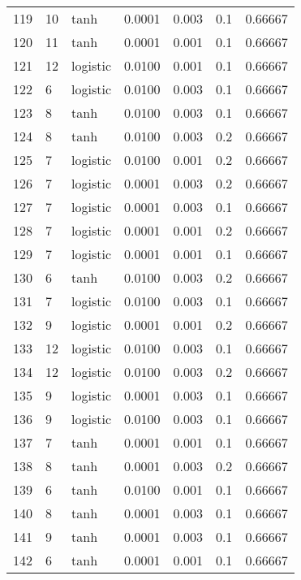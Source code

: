 \begin{tabular}{lllrrrr}
119 &          10 &      tanh &  0.0001 &  0.003 &  0.1 &   0.66667 \\
120 &          11 &      tanh &  0.0001 &  0.001 &  0.1 &   0.66667 \\
121 &          12 &  logistic &  0.0100 &  0.001 &  0.1 &   0.66667 \\
122 &           6 &  logistic &  0.0100 &  0.003 &  0.1 &   0.66667 \\
123 &           8 &      tanh &  0.0100 &  0.003 &  0.1 &   0.66667 \\
124 &           8 &      tanh &  0.0100 &  0.003 &  0.2 &   0.66667 \\
125 &           7 &  logistic &  0.0100 &  0.001 &  0.2 &   0.66667 \\
126 &           7 &  logistic &  0.0001 &  0.003 &  0.2 &   0.66667 \\
127 &           7 &  logistic &  0.0001 &  0.003 &  0.1 &   0.66667 \\
128 &           7 &  logistic &  0.0001 &  0.001 &  0.2 &   0.66667 \\
129 &           7 &  logistic &  0.0001 &  0.001 &  0.1 &   0.66667 \\
130 &           6 &      tanh &  0.0100 &  0.003 &  0.2 &   0.66667 \\
131 &           7 &  logistic &  0.0100 &  0.003 &  0.1 &   0.66667 \\
132 &           9 &  logistic &  0.0001 &  0.001 &  0.2 &   0.66667 \\
133 &          12 &  logistic &  0.0100 &  0.003 &  0.1 &   0.66667 \\
134 &          12 &  logistic &  0.0100 &  0.003 &  0.2 &   0.66667 \\
135 &           9 &  logistic &  0.0001 &  0.003 &  0.1 &   0.66667 \\
136 &           9 &  logistic &  0.0100 &  0.003 &  0.1 &   0.66667 \\
137 &           7 &      tanh &  0.0001 &  0.001 &  0.1 &   0.66667 \\
138 &           8 &      tanh &  0.0001 &  0.003 &  0.2 &   0.66667 \\
139 &           6 &      tanh &  0.0100 &  0.001 &  0.1 &   0.66667 \\
140 &           8 &      tanh &  0.0001 &  0.003 &  0.1 &   0.66667 \\
141 &           9 &      tanh &  0.0001 &  0.003 &  0.1 &   0.66667 \\
142 &           6 &      tanh &  0.0001 &  0.001 &  0.1 &   0.66667 \\

\end{tabular}
